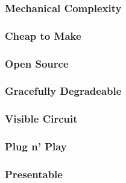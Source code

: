 \documentclass{article}
\begin{document}
\subsubsection {Mechanical Complexity}
\subsubsection{Cheap to Make}
\subsubsection{Open Source}
\subsubsection{Gracefully Degradeable}
\subsubsection{Visible Circuit}
\subsubsection{Plug n' Play}
\subsubsection{Presentable}
\end{document}
